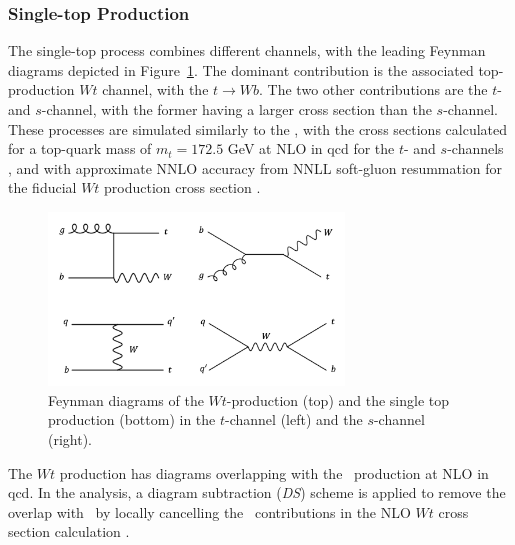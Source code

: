 \subsubsection{Single-top Production}
The single-top process combines different channels, with the leading Feynman diagrams depicted in Figure~\ref{fig:feynstop}. The dominant contribution is the associated top-production $Wt$ channel, with the $t \rightarrow Wb$. The two other contributions are the $t$- and $s$-channel, with the former having a larger cross section than the $s$-channel. These processes are simulated similarly to the \ttb, with the cross sections calculated for a top-quark mass of $m_t = 172.5$ GeV at NLO in \gls{qcd} for the $t$- and $s$-channels \cite{ALIEV20111034, KANT201574}, and with approximate NNLO accuracy from NNLL soft-gluon resummation for the fiducial $Wt$ production cross section \cite{PhysRevD.82.054018, kidonakis2013quark}.
\begin{figure}[h!]
  \center
  \includegraphics[width=0.7\textwidth]{Images/VH/Feynman/singletop.png}
  \caption{Feynman diagrams of the $Wt$-production (top) and the single top production (bottom) in the $t$-channel (left) and the $s$-channel (right).} 
  \label{fig:feynstop}
\end{figure}

The $Wt$ production has diagrams overlapping with the \ttb\ production at NLO in \gls{qcd}. In the analysis, a diagram subtraction (\textit{DS}) scheme is applied to remove the overlap with \ttb\ by locally cancelling the \ttb\ contributions in the NLO $Wt$ cross section calculation \cite{StefanoFrixione_2008}. 


